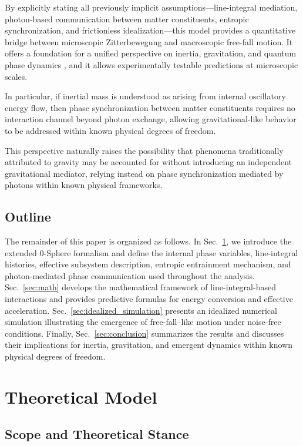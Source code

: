 \documentclass[
 reprint,
 amsmath,amssymb,
 aps,
 prb,
]{revtex4-2}
\numberwithin{equation}{section}
\begin{document}
By explicitly stating all previously implicit assumptions—line-integral mediation, photon-based communication between matter constituents, entropic synchronization, and frictionless idealization—this model provides a quantitative bridge between microscopic Zitterbewegung and macroscopic free-fall motion. It offers a foundation for a unified perspective on inertia, gravitation, and quantum phase dynamics \cite{Jacobson1995,Verlinde2011,Padmanabhan2010}, and it allows experimentally testable predictions at microscopic scales.

In particular, if inertial mass is understood as arising from internal oscillatory energy flow, then phase synchronization between matter constituents requires no interaction channel beyond photon exchange, allowing gravitational-like behavior to be addressed within known physical degrees of freedom.

This perspective naturally raises the possibility that phenomena traditionally attributed to gravity may be accounted for without introducing an independent gravitational mediator, relying instead on phase synchronization mediated by photons within known physical frameworks.

\subsection*{Outline}

The remainder of this paper is organized as follows. In Sec.~\ref{sec:theory}, we introduce the extended 0-Sphere formalism and define the internal phase variables, line-integral histories, effective subsystem description, entropic entrainment mechanism, and photon-mediated phase communication used throughout the analysis. Sec.~\ref{sec:math} develops the mathematical framework of line-integral-based interactions and provides predictive formulas for energy conversion and effective acceleration. Sec.~\ref{sec:idealized_simulation} presents an idealized numerical simulation illustrating the emergence of free-fall–like motion under noise-free conditions. Finally, Sec.~\ref{sec:conclusion} summarizes the results and discusses their implications for inertia, gravitation, and emergent dynamics within known physical degrees of freedom.

\section{Theoretical Model}
\label{sec:theory}

\subsection{Scope and Theoretical Stance}
\end{document}
